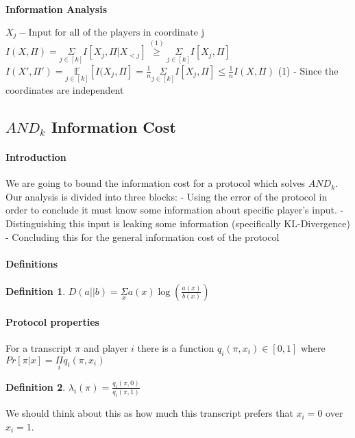 \documentclass{article}
\theoremstyle{plain}
\newtheorem{definition}{Definition}
\begin{document}
\paragraph{Information Analysis}
$X_j - \text{Input for all of the players in coordinate j}$ \newline
$I(X, \Pi) = \underset{j\in[k]}{\Sigma} I[X_j, \Pi | X_{<j}] \overset{(1)}{\geq } \underset{j\in[k]}{\Sigma} I[X_j, \Pi]$ \newline
$I(X', \Pi ') = \underset{j \in [k]}{\mathbb{E}}[I(X_j, \Pi] = \frac{1}{n}\underset{j\in[k]}{\Sigma} I[X_j, \Pi] \leq \frac{1}{n}I(X, \Pi)$ \newline
(1) - Since the coordinates are independent

\subsection{$AND_k$ Information Cost}
\paragraph{Introduction}
We are going to bound the information cost for a protocol which solves $AND_k$. Our analysis is divided into three blocks:  - Using the error of the protocol in order to conclude it must know some information about specific player's input.  - Distinguishing this input is leaking some information (specifically KL-Divergence)  - Concluding this for the general information cost of the protocol \newline
\paragraph{Definitions}
\begin{definition}
$D(a || b) = \underset{x}{\Sigma}a(x)\log(\frac{a(x)}{b(x)})$
\end{definition}
\paragraph{Protocol properties}
For a transcript $\pi$ and player $i$ there is a function $q_i(\pi, x_i) \in [0,1]$ where \newline
$Pr[\pi | x] = \underset{i}{\Pi}q_i(\pi, x_i )$
\begin{definition}
$\lambda _i (\pi) = \frac{q_i(\pi, 0)}{q_i(\pi, 1)}$
\end{definition}
We should think about this as how much this transcript prefers that $x_i = 0$ over $x_i = 1$.
\end{document}
